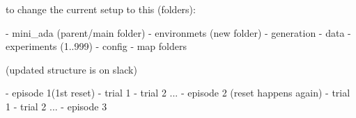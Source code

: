 to change the current setup to this (folders):

- mini_ada (parent/main folder)
  - environmets (new folder)
    - generation
    - data
      - experiments (1..999)
        - config
        - map folders


        (updated structure is on slack)



- episode 1(1st reset)
  - trial 1
  - trial 2
  ...
- episode 2 (reset happens again)
  - trial 1
  - trial 2
  ...
- episode 3
